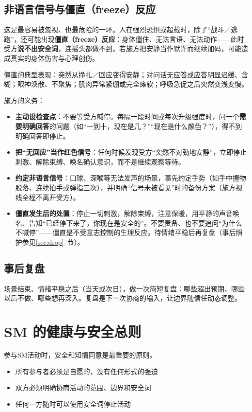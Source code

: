 \documentclass[12pt,UTF8]{ctexbook}
\begin{document}
\subsection{非语言信号与僵直（freeze）反应}\label{sec:freeze}

这是最容易被忽视、也最危险的一环。人在强烈恐惧或超载时，除了“战斗／逃跑”，还可能出现\textbf{僵直（freeze）反应}：身体僵住、无法言语、无法动作——此时受方\textbf{说不出安全词}，连摇头都做不到。若施方把安静当作默许而继续加码，可能造成真实的身体伤害与心理创伤。

僵直的典型表现：突然从挣扎／回应变得安静；对问话无应答或应答明显迟缓、含糊；眼神涣散、不聚焦；肌肉异常紧绷或完全瘫软；呼吸急促之后突然变浅变慢。

施方的义务：

\begin{itemize}
\item \textbf{主动设检查点}：不要等受方喊停。每隔一段时间或每次升级强度时，问一个\textbf{需要明确回答}的问题（如“一到十，现在是几？”“现在是什么颜色？”），得不到明确回答即停止。
\item \textbf{把“无回应”当作红色信号}：任何时候发现受方“突然不对劲地安静”，立即停止刺激、解除束缚、唤名确认意识，而不是继续观察等待。
\item \textbf{约定非语言信号}：口球、深喉等无法发声的场景，事先约定手势（如手中握物脱落、连续拍手或弹指三次），并明确“信号未被看见”时的备份方案（施方视线全程不离开受方）。
\item \textbf{僵直发生后的处置}：停止一切刺激，解除束缚，注意保暖，用平静的声音唤名、告知“已经停下来了，你现在是安全的”。不要责备、也不要追问“为什么不喊停”——僵直是不受意志控制的生理反应。待情绪平稳后再复盘（事后照护参见\ref{sec:drop}~节）。
\end{itemize}

\subsection{事后复盘}

场景结束、情绪平稳之后（当天或次日），做一次简短复盘：哪些超出预期、哪些以后不做、哪些想再深入。复盘是下一次协商的输入，让边界随信任动态调整。


\section{SM 的健康与安全总则}

参与SM活动时，安全和知情同意是最重要的原则。

  \begin{itemize}
  \item 所有参与者必须是自愿的，没有任何形式的强迫
  \item 双方必须明确协商活动的范围、边界和安全词
  \item 任何一方随时可以使用安全词停止活动
  \end{itemize}
\end{document}
